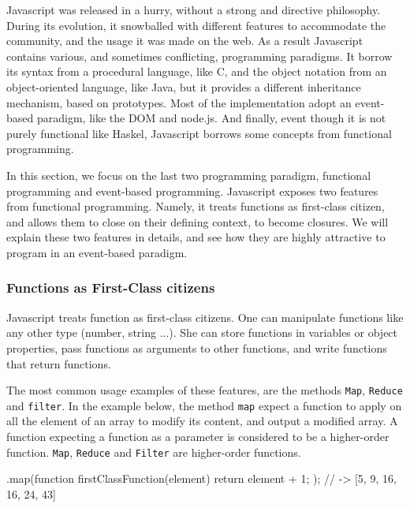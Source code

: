 Javascript was released in a hurry, without a strong and directive philosophy.
During its evolution, it snowballed with different features to accommodate the community, and the usage it was made on the web. As a result Javascript contains various, and sometimes conflicting, programming paradigms.
It borrow its syntax from a procedural language, like C, and the object notation from an object-oriented language, like Java, but it provides a different inheritance mechanism, based on prototypes. Most of the implementation adopt an event-based paradigm, like the DOM and node.js.
And finally, event though it is not purely functional like Haskel, Javascript borrows some concepts from functional programming.

In this section, we focus on the last two programming paradigm, functional programming and event-based programming.
Javascript exposes two features from functional programming.
Namely, it treats functions as first-class citizen, and allows them to close on their defining context, to become closures.
We will explain these two features in details, and see how they are highly attractive to program in an event-based paradigm.

\subsubsection{Functions as First-Class citizens}


Javascript treats function as first-class citizens.
One can manipulate functions like any other type (number, string ...).
She can store functions in variables or object properties, pass functions as arguments to other functions, and write functions that return functions.

The most common usage examples of these features, are the methods \texttt{Map}, \texttt{Reduce} and \texttt{filter}.
In the example below, the method \texttt{map} expect a function to apply on all the element of an array to modify its content, and output a modified array.
A function expecting a function as a parameter is considered to be a higher-order function. \texttt{Map}, \texttt{Reduce} and \texttt{Filter} are higher-order functions.

\begin{code}
  [4, 8, 15, 16, 23, 42].map(function firstClassFunction(element) {
    return element + 1;
  });
  // -> [5, 9, 16, 16, 24, 43]
\end{code}

